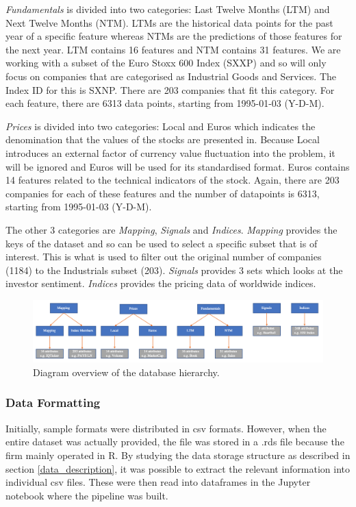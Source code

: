 \documentclass[10pt,onecolumn,letterpaper]{article}
\begin{document}
\textit{Fundamentals} is divided into two categories: Last Twelve Months (LTM) and Next Twelve Months (NTM). LTMs are the historical data points for the past year of a specific feature whereas NTMs are the predictions of those features for the next year. LTM contains 16 features and NTM contains 31 features. We are working with a subset of the Euro Stoxx 600 Index (SXXP) and so will only focus on companies that are categorised as Industrial Goods and Services. The Index ID for this is SXNP. There are 203 companies that fit this category. For each feature, there are 6313 data points, starting from 1995-01-03 (Y-D-M). 

\textit{Prices} is divided into two categories: Local and Euros which indicates the denomination that the values of the stocks are presented in. Because Local introduces an external factor of currency value fluctuation into the problem, it will be ignored and Euros will be used for its standardised format. Euros contains 14 features related to the technical indicators of the stock. Again, there are 203 companies for each of these features and the number of datapoints is 6313, starting from 1995-01-03 (Y-D-M). 

The other 3 categories are \textit{Mapping}, \textit{Signals} and \textit{Indices}. \textit{Mapping} provides the keys of the dataset and so can be used to select a specific subset that is of interest. This is what is used to filter out the original number of companies (1184) to the Industrials subset (203). \textit{Signals} provides 3 sets which looks at the investor sentiment. \textit{Indices} provides the pricing data of worldwide indices.  

\begin{figure}[!hbt!]
\centering
\includegraphics[width=14.5cm]{database.png}
\caption{Diagram overview of the database hierarchy.}
\end{figure}

\subsubsection{Data Formatting}

Initially, sample formats were distributed in csv formats. However, when the entire dataset was actually provided, the file was stored in a .rds file because the firm mainly operated in R. By studying the data storage structure as described in section \ref{data_description}, it was possible to extract the relevant information into individual csv files. These were then read into dataframes in the Jupyter notebook where the pipeline was built. 
\end{document}
